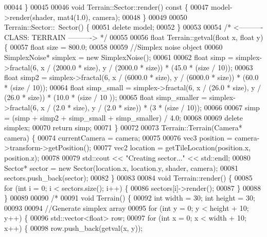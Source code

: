 \begin{DoxyCode}
00044 \}
00045 
00046 \textcolor{keywordtype}{void} Terrain::Sector::render()\textcolor{keyword}{ const }\{
00047     model->render(shader, mat4(1.0), camera);
00048 \}
00049 
00050 Terrain::Sector::~Sector() \{
00051     \textcolor{keyword}{delete} model;
00052 \}
00053 
00054 \textcolor{comment}{/* <---------- CLASS: TERRAIN ----------> */}
00055 
00056 \textcolor{keywordtype}{float} Terrain::getval(\textcolor{keywordtype}{float} x, \textcolor{keywordtype}{float} y) \{
00057     \textcolor{keywordtype}{float} size = 800.0;
00058 
00059     \textcolor{comment}{//Simplex noise object}
00060     SimplexNoise* simplex = \textcolor{keyword}{new} SimplexNoise();
00061 
00062     \textcolor{keywordtype}{float} simp         = simplex->fractal(6, x / (2000.0 * size),  y / (2000.0 * size))  * (45.0 * (size / 
      10));
00063     \textcolor{keywordtype}{float} simp2        = simplex->fractal(6, x / (6000.0 * size),  y / (6000.0 * size))  * (60.0 * (size / 
      10));
00064     \textcolor{keywordtype}{float} simp\_small   = simplex->fractal(6, x / (26.0 * size),   y / (26.0 * size))   * (10.0 * (size / 10
      ));
00065     \textcolor{keywordtype}{float} simp\_smaller = simplex->fractal(6, x / (2.0 * size),    y / (2.0 * size))    * (3 * (size / 10));
00066 
00067     simp = (simp + simp2 + simp\_small + simp\_smaller) / 4.0;
00068 
00069     \textcolor{keyword}{delete} simplex;
00070     \textcolor{keywordflow}{return} simp;
00071 \}
00072 
00073 Terrain::Terrain(Camera* camera) \{
00074     currentCamera = camera;
00075     
00076     vec3 position = camera->transform->getPosition();
00077     vec2 location = getTileLocation(position.x, position.z);
00078 
00079     std::cout << \textcolor{stringliteral}{"Creating sector..."} << std::endl;
00080     Sector* sector = \textcolor{keyword}{new} Sector(location.x, location.y, shader, camera);
00081     sectors.push\_back(sector);
00082 \}
00083 
00084 \textcolor{keywordtype}{void} Terrain::render() \{
00085     \textcolor{keywordflow}{for} (\textcolor{keywordtype}{int} i = 0; i < sectors.size(); i++) \{
00086         sectors[i]->render();
00087     \}
00088 \}
00089 
00090 \textcolor{comment}{/*}
00091 \textcolor{comment}{void Terrain() \{}
00092 \textcolor{comment}{    int width = 30; int height = 30;}
00093 \textcolor{comment}{}
00094 \textcolor{comment}{    //Generate simplex array}
00095 \textcolor{comment}{    for (int y = 0; y < height + 10; y++) \{}
00096 \textcolor{comment}{        std::vector<float> row;}
00097 \textcolor{comment}{        for (int x = 0; x < width + 10; x++) \{}
00098 \textcolor{comment}{            row.push\_back(getval(x, y));}

\end{DoxyCode}

